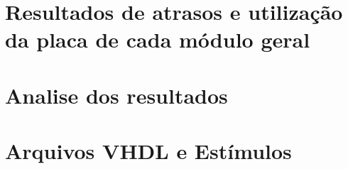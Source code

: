 \documentclass[a4paper]{article}
\begin{document}
\section{\textbf{Resultados de atrasos e utilização da placa de cada módulo geral}}

\smallskip

\section{\textbf{Analise dos resultados}}

\smallskip

\section{\textbf{Arquivos VHDL e Estímulos}}


\bigskip
\end{document}
